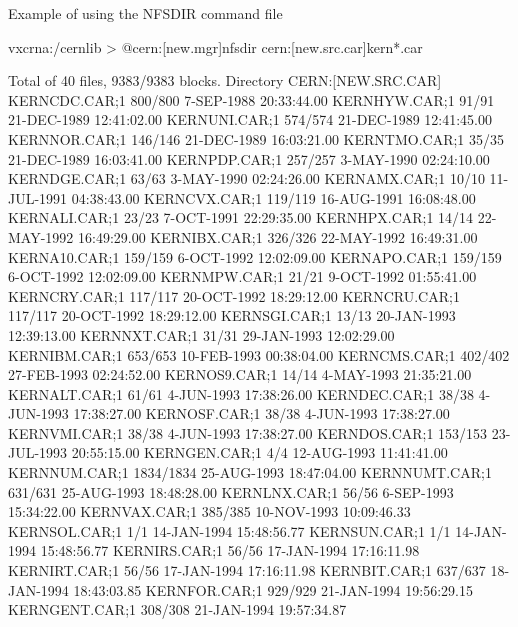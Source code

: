 \begin{XMPt}{Example of using the NFSDIR command file}

vxcrna:/cernlib > @cern:[new.mgr]nfsdir cern:[new.src.car]kern*.car

Total of 40 files, 9383/9383 blocks.
Directory CERN:[NEW.SRC.CAR]
KERNCDC.CAR;1           800/800      7-SEP-1988 20:33:44.00
KERNHYW.CAR;1            91/91      21-DEC-1989 12:41:02.00
KERNUNI.CAR;1           574/574     21-DEC-1989 12:41:45.00
KERNNOR.CAR;1           146/146     21-DEC-1989 16:03:21.00
KERNTMO.CAR;1            35/35      21-DEC-1989 16:03:41.00
KERNPDP.CAR;1           257/257      3-MAY-1990 02:24:10.00
KERNDGE.CAR;1            63/63       3-MAY-1990 02:24:26.00
KERNAMX.CAR;1            10/10      11-JUL-1991 04:38:43.00
KERNCVX.CAR;1           119/119     16-AUG-1991 16:08:48.00
KERNALI.CAR;1            23/23       7-OCT-1991 22:29:35.00
KERNHPX.CAR;1            14/14      22-MAY-1992 16:49:29.00
KERNIBX.CAR;1           326/326     22-MAY-1992 16:49:31.00
KERNA10.CAR;1           159/159      6-OCT-1992 12:02:09.00
KERNAPO.CAR;1           159/159      6-OCT-1992 12:02:09.00
KERNMPW.CAR;1            21/21       9-OCT-1992 01:55:41.00
KERNCRY.CAR;1           117/117     20-OCT-1992 18:29:12.00
KERNCRU.CAR;1           117/117     20-OCT-1992 18:29:12.00
KERNSGI.CAR;1            13/13      20-JAN-1993 12:39:13.00
KERNNXT.CAR;1            31/31      29-JAN-1993 12:02:29.00
KERNIBM.CAR;1           653/653     10-FEB-1993 00:38:04.00
KERNCMS.CAR;1           402/402     27-FEB-1993 02:24:52.00
KERNOS9.CAR;1            14/14       4-MAY-1993 21:35:21.00
KERNALT.CAR;1            61/61       4-JUN-1993 17:38:26.00
KERNDEC.CAR;1            38/38       4-JUN-1993 17:38:27.00
KERNOSF.CAR;1            38/38       4-JUN-1993 17:38:27.00
KERNVMI.CAR;1            38/38       4-JUN-1993 17:38:27.00
KERNDOS.CAR;1           153/153     23-JUL-1993 20:55:15.00
KERNGEN.CAR;1             4/4       12-AUG-1993 11:41:41.00
KERNNUM.CAR;1          1834/1834    25-AUG-1993 18:47:04.00
KERNNUMT.CAR;1          631/631     25-AUG-1993 18:48:28.00
KERNLNX.CAR;1            56/56       6-SEP-1993 15:34:22.00
KERNVAX.CAR;1           385/385     10-NOV-1993 10:09:46.33
KERNSOL.CAR;1             1/1       14-JAN-1994 15:48:56.77
KERNSUN.CAR;1             1/1       14-JAN-1994 15:48:56.77
KERNIRS.CAR;1            56/56      17-JAN-1994 17:16:11.98
KERNIRT.CAR;1            56/56      17-JAN-1994 17:16:11.98
KERNBIT.CAR;1           637/637     18-JAN-1994 18:43:03.85
KERNFOR.CAR;1           929/929     21-JAN-1994 19:56:29.15
KERNGENT.CAR;1          308/308     21-JAN-1994 19:57:34.87

\end{XMPt}

